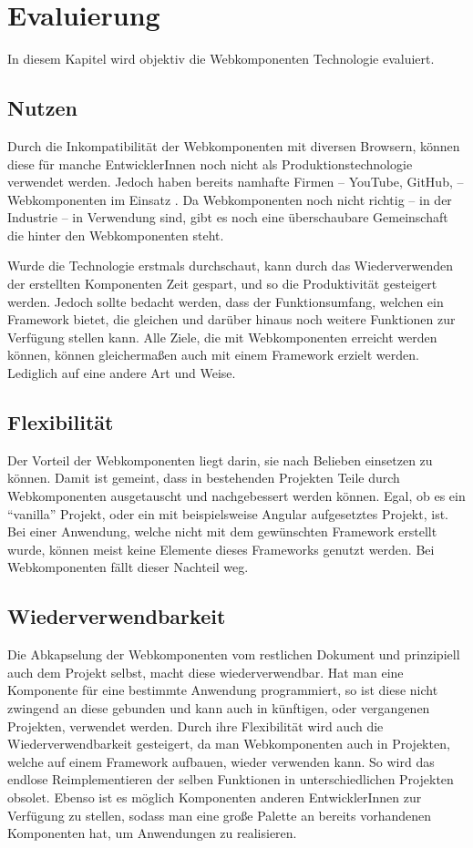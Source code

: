 \chapter{Evaluierung}
In diesem Kapitel wird objektiv die Webkomponenten Technologie evaluiert.

\section{Nutzen}
Durch die Inkompatibilität der Webkomponenten mit diversen Browsern, können diese für manche EntwicklerInnen noch nicht als Produktionstechnologie verwendet werden. Jedoch haben bereits namhafte Firmen -- YouTube, GitHub, \etc -- Webkomponenten im Einsatz \cite{webcomponents-production-use}. 
Da Webkomponenten noch nicht richtig -- in der Industrie -- in Verwendung sind, gibt es noch eine überschaubare Gemeinschaft die hinter den Webkomponenten steht. 

Wurde die Technologie erstmals durchschaut, kann durch das Wiederverwenden der erstellten Komponenten Zeit gespart, und so die Produktivität gesteigert werden. Jedoch sollte bedacht werden, dass der Funktionsumfang, welchen ein Framework bietet, die gleichen und darüber hinaus noch weitere Funktionen zur Verfügung stellen kann. Alle Ziele, die mit Webkomponenten erreicht werden können, können gleichermaßen auch mit einem Framework erzielt werden. Lediglich auf eine andere Art und Weise. 

\section{Flexibilität}
Der Vorteil der Webkomponenten liegt darin, sie nach Belieben einsetzen zu können. Damit ist gemeint, dass in bestehenden Projekten Teile durch Webkomponenten ausgetauscht und nachgebessert werden können. Egal, ob es ein "`vanilla"' Projekt, oder ein mit beispielsweise Angular aufgesetztes Projekt, ist. Bei einer Anwendung, welche nicht mit dem gewünschten Framework erstellt wurde, können meist keine Elemente dieses Frameworks genutzt werden. Bei Webkomponenten fällt dieser Nachteil weg.

\section{Wiederverwendbarkeit}

Die Abkapselung der Webkomponenten vom restlichen Dokument und prinzipiell auch dem Projekt selbst, macht diese wiederverwendbar. Hat man eine Komponente für eine  bestimmte Anwendung programmiert, so ist diese nicht zwingend an diese gebunden und kann auch in künftigen, oder vergangenen Projekten, verwendet werden. Durch ihre Flexibilität wird auch die Wiederverwendbarkeit gesteigert, da man Webkomponenten auch in Projekten, welche auf einem Framework aufbauen, wieder verwenden kann. So wird das endlose Reimplementieren der selben Funktionen in unterschiedlichen Projekten obsolet. Ebenso ist es möglich Komponenten anderen EntwicklerInnen zur Verfügung zu stellen, sodass man eine große Palette an bereits vorhandenen Komponenten hat, um Anwendungen zu realisieren.

